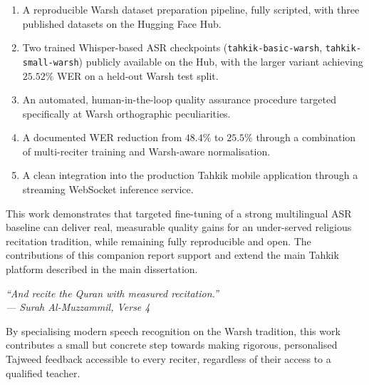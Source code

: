 \documentclass[12pt,a4paper]{report}
\begin{document}
\begin{emeraldbox}[title=Key Contributions]
\begin{enumerate}
  \item A reproducible Warsh dataset preparation pipeline, fully
        scripted, with three published datasets on the Hugging Face Hub.
  \item Two trained Whisper-based ASR checkpoints
        (\texttt{tahkik-basic-warsh}, \texttt{tahkik-small-warsh})
        publicly available on the Hub, with the larger variant
        achieving $25.52\%$ WER on a held-out Warsh test split.
  \item An automated, human-in-the-loop quality assurance procedure
        targeted specifically at Warsh orthographic peculiarities.
  \item A documented WER reduction from $48.4\%$ to $25.5\%$ through a
        combination of multi-reciter training and Warsh-aware
        normalisation.
  \item A clean integration into the production Tahkik mobile
        application through a streaming WebSocket inference service.
\end{enumerate}
\end{emeraldbox}

This work demonstrates that targeted fine-tuning of a strong
multilingual ASR baseline can deliver real, measurable quality gains
for an under-served religious recitation tradition, while remaining
fully reproducible and open. The contributions of this companion report
support and extend the main Tahkik platform described in the main
dissertation.

\begin{emeraldbox}[title=Closing Statement]
\begin{center}
\large\itshape
``And recite the Quran with measured recitation.''\\[6pt]
\normalsize\normalfont\color{black} --- Surah Al-Muzzammil, Verse 4
\end{center}
\vspace{6pt}
\normalsize
By specialising modern speech recognition on the Warsh tradition, this
work contributes a small but concrete step towards making rigorous,
personalised Tajweed feedback accessible to every reciter, regardless
of their access to a qualified teacher.
\end{emeraldbox}

\end{document}
